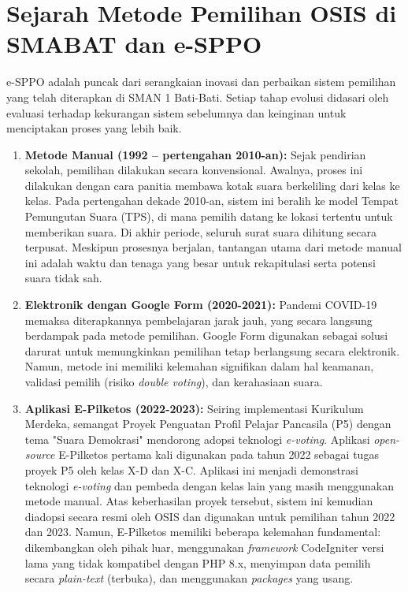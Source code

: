 \section{Sejarah Metode Pemilihan OSIS di SMABAT dan e-SPPO}
\label{sec:sejarah_esppo}
e-SPPO adalah puncak dari serangkaian inovasi dan perbaikan sistem pemilihan yang telah diterapkan di SMAN 1 Bati-Bati. Setiap tahap evolusi didasari oleh evaluasi terhadap kekurangan sistem sebelumnya dan keinginan untuk menciptakan proses yang lebih baik.
\begin{enumerate}
	\item \textbf{Metode Manual (1992 -- pertengahan 2010-an):} Sejak pendirian sekolah, pemilihan dilakukan secara konvensional. Awalnya, proses ini dilakukan dengan cara panitia membawa kotak suara berkeliling dari kelas ke kelas. Pada pertengahan dekade 2010-an, sistem ini beralih ke model Tempat Pemungutan Suara (TPS), di mana pemilih datang ke lokasi tertentu untuk memberikan suara. Di akhir periode, seluruh surat suara dihitung secara terpusat. Meskipun prosesnya berjalan, tantangan utama dari metode manual ini adalah waktu dan tenaga yang besar untuk rekapitulasi serta potensi suara tidak sah.
	\item \textbf{Elektronik dengan Google Form (2020-2021):} Pandemi COVID-19 memaksa diterapkannya pembelajaran jarak jauh, yang secara langsung berdampak pada metode pemilihan. Google Form digunakan sebagai solusi darurat untuk memungkinkan pemilihan tetap berlangsung secara elektronik. Namun, metode ini memiliki kelemahan signifikan dalam hal keamanan, validasi pemilih (risiko \textit{double voting}), dan kerahasiaan suara.
	\item \textbf{Aplikasi E-Pilketos (2022-2023):} Seiring implementasi Kurikulum Merdeka, semangat Proyek Penguatan Profil Pelajar Pancasila (P5) dengan tema "Suara Demokrasi" mendorong adopsi teknologi \textit{e-voting}. Aplikasi \textit{open-source} E-Pilketos pertama kali digunakan pada tahun 2022 sebagai tugas proyek P5 oleh kelas X-D dan X-C. Aplikasi ini menjadi demonstrasi teknologi \textit{e-voting} dan pembeda dengan kelas lain yang masih menggunakan metode manual. Atas keberhasilan proyek tersebut, sistem ini kemudian diadopsi secara resmi oleh OSIS dan digunakan untuk pemilihan tahun 2022 dan 2023. Namun, E-Pilketos memiliki beberapa kelemahan fundamental: dikembangkan oleh pihak luar, menggunakan \textit{framework} CodeIgniter versi lama yang tidak kompatibel dengan PHP 8.x, menyimpan data pemilih secara \textit{plain-text} (terbuka), dan menggunakan \textit{packages} yang usang.

\end{enumerate}
